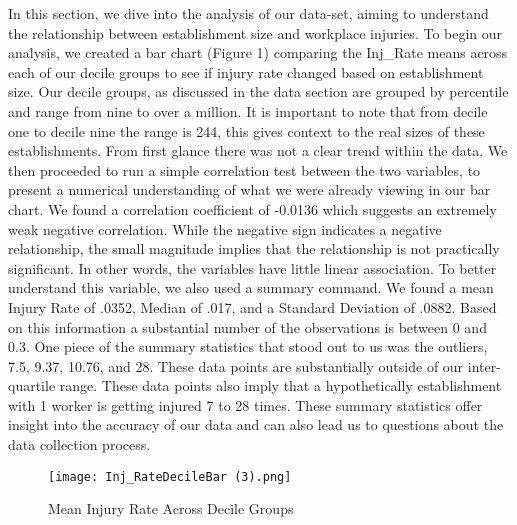 \documentclass[12pt]{article}
\begin{document}
In this section, we dive into the analysis of our data-set, aiming to understand the relationship between establishment size and workplace injuries. To begin our analysis, we created a bar chart (Figure 1) comparing the Inj\_Rate means across each of our decile groups to see if injury rate changed based on establishment size. Our decile groups, as discussed in the data section are grouped by percentile and range from nine to over a million. It is important to note that from decile one to decile nine the range is 244, this gives context to the real sizes of these establishments. From first glance there was not a clear trend within the data. We then proceeded to run a simple correlation test between the two variables, to present a numerical understanding of what we were already viewing in our bar chart. We found a correlation coefficient of -0.0136 which suggests an extremely weak negative correlation. While the negative sign indicates a negative relationship, the small magnitude implies that the relationship is not practically significant. In other words, the variables have little linear association. To better understand this variable, we also used a summary command. We found a mean Injury Rate of .0352, Median of .017, and a Standard Deviation of .0882. Based on this information a substantial number of the observations is between 0 and 0.3. One piece of the summary statistics that stood out to us was the outliers, 7.5, 9.37, 10.76, and 28. These data points are substantially outside of our inter-quartile range. These data points also imply that a hypothetically establishment with 1 worker is getting injured 7 to 28 times. These summary statistics offer insight into the accuracy of our data and can also lead us to questions about the data collection process.
\begin{figure}
    \centering
    \texttt{[image: Inj\_RateDecileBar (3).png]}
    \caption{Mean Injury Rate Across Decile Groups}
    \label{Figure 1:}
\end{figure}
\end{document}
